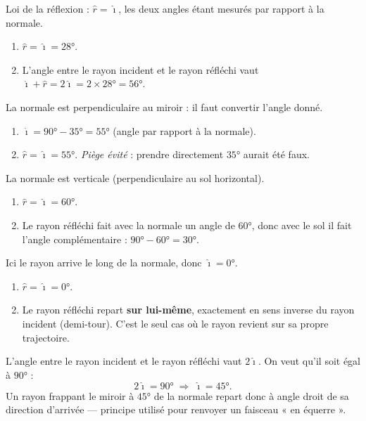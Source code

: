 \documentclass[11pt,a4paper]{article}
\begin{document}
\begin{corrige}
Loi de la réflexion : $\hat{r}=\hat{\imath}$, les deux angles étant mesurés par rapport à la normale.
\begin{enumerate}[label=\alph*)]
  \item $\hat{r}=\hat{\imath}=\ang{28}$.
  \item L'angle entre le rayon incident et le rayon réfléchi vaut $\hat{\imath}+\hat{r}=2\hat{\imath}
        =2\times\ang{28}=\ang{56}$.
\end{enumerate}
\end{corrige}

\begin{corrige}
La normale est perpendiculaire au miroir : il faut convertir l'angle donné.
\begin{enumerate}[label=\alph*)]
  \item $\hat{\imath}=\ang{90}-\ang{35}=\ang{55}$ (angle par rapport à la normale).
  \item $\hat{r}=\hat{\imath}=\ang{55}$. \emph{Piège évité} : prendre directement $\ang{35}$ aurait
        été faux.
\end{enumerate}
\end{corrige}

\begin{corrige}
La normale est verticale (perpendiculaire au sol horizontal).
\begin{enumerate}[label=\alph*)]
  \item $\hat{r}=\hat{\imath}=\ang{60}$.
  \item Le rayon réfléchi fait avec la normale un angle de $\ang{60}$, donc avec le sol il fait
        l'angle complémentaire : $\ang{90}-\ang{60}=\ang{30}$.
\end{enumerate}
\end{corrige}

\begin{corrige}
Ici le rayon arrive le long de la normale, donc $\hat{\imath}=\ang{0}$.
\begin{enumerate}[label=\alph*)]
  \item $\hat{r}=\hat{\imath}=\ang{0}$.
  \item Le rayon réfléchi repart \textbf{sur lui-même}, exactement en sens inverse du rayon incident
        (demi-tour). C'est le seul cas où le rayon revient sur sa propre trajectoire.
\end{enumerate}
\end{corrige}

\begin{corrige}
L'angle entre le rayon incident et le rayon réfléchi vaut $2\hat{\imath}$. On veut qu'il soit égal
à $\ang{90}$ :
\[ 2\hat{\imath}=\ang{90}\;\Longrightarrow\; \hat{\imath}=\ang{45}. \]
Un rayon frappant le miroir à $\ang{45}$ de la normale repart donc à angle droit de sa direction
d'arrivée — principe utilisé pour renvoyer un faisceau « en équerre ».
\end{corrige}
\end{document}
